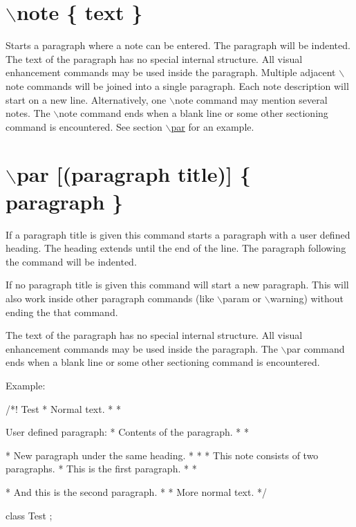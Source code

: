  \hypertarget{commands_cmdnote}{}\section{$\backslash$note \{ text \}}\label{commands_cmdnote}
 Starts a paragraph where a note can be entered. The paragraph will be indented. The text of the paragraph has no special internal structure. All visual enhancement commands may be used inside the paragraph. Multiple adjacent $\backslash$note commands will be joined into a single paragraph. Each note description will start on a new line. Alternatively, one $\backslash$note command may mention several notes. The $\backslash$note command ends when a blank line or some other sectioning command is encountered. See section \hyperlink{commands_cmdpar}{$\backslash$par} for an example.



 \hypertarget{commands_cmdpar}{}\section{$\backslash$par \mbox{[}(paragraph title)\mbox{]} \{ paragraph \}}\label{commands_cmdpar}
 If a paragraph title is given this command starts a paragraph with a user defined heading. The heading extends until the end of the line. The paragraph following the command will be indented.

If no paragraph title is given this command will start a new paragraph. This will also work inside other paragraph commands (like $\backslash$param or $\backslash$warning) without ending the that command.

The text of the paragraph has no special internal structure. All visual enhancement commands may be used inside the paragraph. The $\backslash$par command ends when a blank line or some other sectioning command is encountered.

\begin{DoxyParagraph}{Example:}

\begin{DoxyVerbInclude}
/*! \class Test
 * Normal text.
 *
 * \par User defined paragraph:
 * Contents of the paragraph.
 *
 * \par
 * New paragraph under the same heading.
 *
 * \note
 * This note consists of two paragraphs.
 * This is the first paragraph.
 *
 * \par
 * And this is the second paragraph.
 *
 * More normal text. 
 */
  
class Test {};
\end{DoxyVerbInclude}
 
\end{DoxyParagraph}



